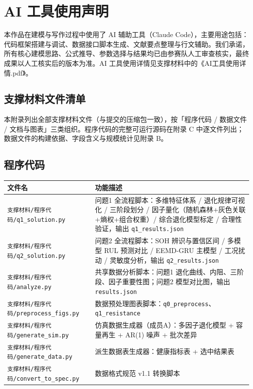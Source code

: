 \documentclass[withoutpreface]{cumcmthesis}
\begin{document}
\section{AI 工具使用声明}
本作品在建模与写作过程中使用了 AI 辅助工具（Claude Code），主要用途包括：代码框架搭建与调试、数据接口脚本生成、文献要点整理与行文辅助。我们承诺，所有核心建模思路、公式推导、参数选择与结果均已由参赛队人工审查核实，最终成果以人工核实后的版本为准。AI 工具使用详情见支撑材料中的《AI工具使用详情.pdf》。

\nocite{*}



\newpage
\begin{appendices}

\section{支撑材料文件清单}
本附录列出全部支撑材料文件（与提交的压缩包一致），按「程序代码 / 数据文件 / 文档与图表」三类组织。程序代码的完整可运行源码在附录 C 中逐文件列出；数据文件的构建依据、字段含义与规模统计见附录 B。

\subsection{程序代码}
\begin{table}[H]
\centering
\small
\begin{tabularx}{\textwidth}{LL}
\toprule
文件名 & 功能描述 \\
\midrule
\texttt{支撑材料/程序代码/q1\_solution.py} & 问题1 全流程脚本：多维特征体系 / 退化规律可视化 / 三阶段划分 / 因子量化（随机森林+灰色关联+熵权+组合权重）/ 综合退化模型标定 / 合理性验证，输出 \texttt{q1\_results.json} \\
\texttt{支撑材料/程序代码/q2\_solution.py} & 问题2 全流程脚本：SOH 辨识与置信区间 / 多模型 RUL 预测对比 / EEMD-GRU 主模型 / 工况扰动 / 灵敏度分析，输出 \texttt{q2\_results.json} \\
\texttt{支撑材料/程序代码/analyze.py} & 共享数据分析脚本：问题1 退化曲线、内阻、三阶段、因子重要性图；问题2 模型对比图，输出 \texttt{results.json} \\
\texttt{支撑材料/程序代码/preprocess\_figs.py} & 数据预处理图表脚本：\texttt{q0\_preprocess}、\texttt{q1\_resistance} \\
\texttt{支撑材料/程序代码/generate\_sim.py} & 仿真数据生成器（成员A）：多因子退化模型 + 容量再生 + AR(1) 噪声 + 批次差异 \\
\texttt{支撑材料/程序代码/generate\_data.py} & 派生数据表生成器：健康指标表 + 选中结果表 \\
\texttt{支撑材料/程序代码/convert\_to\_spec.py} & 数据格式规范 v1.1 转换脚本 \\
\bottomrule
\end{tabularx}
\label{tab:files}
\end{table}


\end{appendices}
\end{document}
